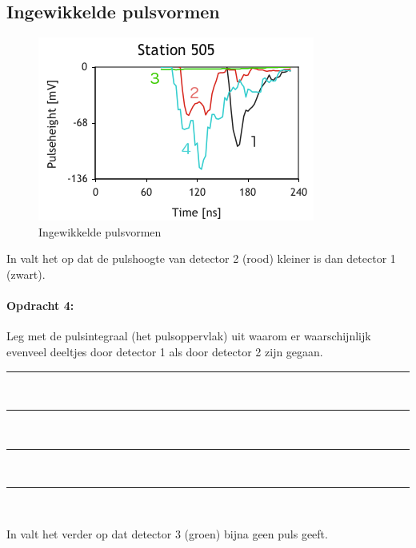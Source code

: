 \subsection{Ingewikkelde pulsvormen}

\begin{figure}[ht]
    \centering
    \includegraphics[scale=0.65]{Figures/Traces505}
    \caption{Ingewikkelde pulsvormen}
    \label{fig:Ingewikkelde-pulsvormen}
\end{figure}


\bigskip{}

In  valt het op dat de pulshoogte
van detector 2 (rood) kleiner is dan detector 1 (zwart).

\begin{minipage}[t]{1\columnwidth}%

\paragraph{Opdracht 4:}

Leg met de pulsintegraal (het pulsoppervlak) uit waarom er
waarschijnlijk evenveel deeltjes door detector 1 als door detector
2 zijn gegaan.

\begin{center}
    \rule{\textwidth}{0.3mm}\\
    \rule{\textwidth}{0.3mm}\\
    \rule{\textwidth}{0.3mm}\\
    \rule{\textwidth}{0.3mm}\\
\end{center}
\end{minipage}

\bigskip{}


In  valt het verder op dat detector
3 (groen) bijna geen puls geeft.

